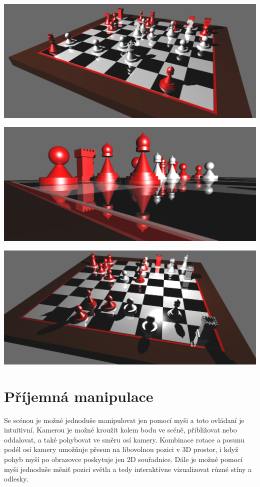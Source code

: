 \documentclass[12pt,a4paper,titlepage,final]{report}
\begin{document}
\begin{center}
	\captionsetup{type=figure}
		\includegraphics[width=0.8\linewidth]{images/scene1.png}
\end{center}

\begin{center}
	\captionsetup{type=figure}
	\includegraphics[width=0.8\linewidth]{images/scene2.png}
\end{center}

\begin{center}
	\captionsetup{type=figure}
	\includegraphics[width=0.8\linewidth]{images/scene3.png}
\end{center}

\section{Příjemná manipulace}
Se scénou je možné jednoduše manipulovat jen pomocí myši a toto ovládaní je intuitivní. Kamerou je možné kroužit kolem bodu ve scéně, přibližovat nebo oddalovat, a také pohybovat ve směru osí kamery. Kombinace rotace a posunu podél osí kamery umožňuje přesun na libovolnou pozici v 3D prostor, i když pohyb myší po obrazovce poskytuje jen 2D souřadnice. Dále je možné pomocí myši jednoduše měniť pozici světla a tedy interaktívne vizualizovat různé stíny a odlesky.
\end{document}
